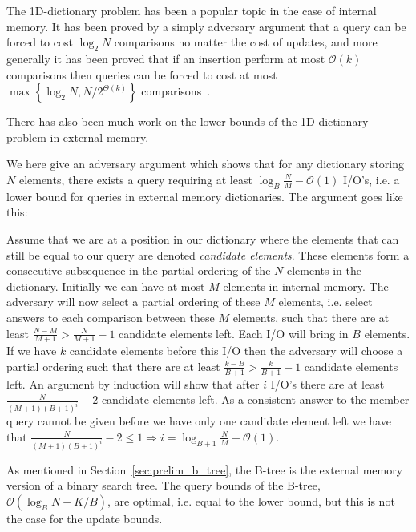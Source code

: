 \documentclass[twoside,11pt,openright]{report}
\begin{document}
The 1D-dictionary problem has been a popular topic in the case of internal memory. It has been proved by a simply adversary argument that a query can be forced to cost $\log_2 N$ comparisons no matter the cost of updates, and more generally it has been proved that if an insertion perform at most $\mathcal{O}(k)$ comparisons then queries can be forced to cost at most $\max\left\lbrace \log_2 N, N/2^{\Theta(k)}\right\rbrace$ comparisons~\cite{Borodin81efficientsearching}.

There has also been much work on the lower bounds of the 1D-dictionary problem in external memory.

We here give an adversary argument which shows that for any dictionary storing $N$ elements, there exists a query requiring at least $\log_B \frac{N}{M} - \mathcal{O}(1)$ I/O's, i.e. a lower bound for queries in external memory dictionaries. The argument goes like this: 

Assume that we are at a position in our dictionary where the elements that can still be equal to our query are denoted \textit{candidate elements}. These elements form a consecutive subsequence in the partial ordering of the $N$ elements in the dictionary.
Initially we can have at most $M$ elements in internal memory. The adversary will now select a partial ordering of these $M$ elements, i.e. select answers to each comparison between these $M$ elements, such that there are at least $\frac{N-M}{M+1} > \frac{N}{M+1}-1$ candidate elements left.
Each I/O will bring in $B$ elements. If we have $k$ candidate elements before this I/O then the adversary will choose a partial ordering such that there are at least $\frac{k-B}{B+1} > \frac{k}{B+1}-1$ candidate elements left.
An argument by induction will show that after $i$ I/O's there are at least $\frac{N}{(M+1)(B+1)^i} - 2$ candidate elements left. As a consistent answer to the member query cannot be given before we have only one candidate element left we have that $\frac{N}{(M+1)(B+1)^i} - 2 \leq 1 \Rightarrow i = \log_{B+1} \frac{N}{M} - \mathcal{O}(1)$.

As mentioned in Section~\ref{sec:prelim_b_tree}, the B-tree is the external memory version of a binary search tree. The query bounds of the B-tree, $\mathcal{O}(\log_B N + K/B)$, are optimal, i.e. equal to the lower bound, but this is not the case for the update bounds.
\end{document}
